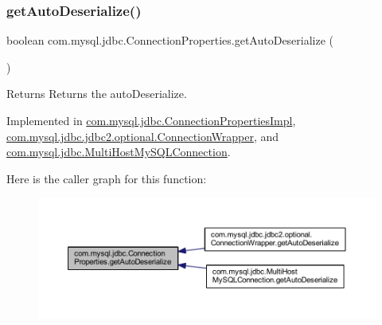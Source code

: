 \subsubsection{\texorpdfstring{get\+Auto\+Deserialize()}{getAutoDeserialize()}}
{\footnotesize\ttfamily boolean com.\+mysql.\+jdbc.\+Connection\+Properties.\+get\+Auto\+Deserialize (\begin{DoxyParamCaption}{ }\end{DoxyParamCaption})}

\begin{DoxyReturn}{Returns}
Returns the auto\+Deserialize. 
\end{DoxyReturn}


Implemented in \mbox{\hyperlink{classcom_1_1mysql_1_1jdbc_1_1_connection_properties_impl_a9ae6fe9a4c45a57da76d048b6fe39c34}{com.\+mysql.\+jdbc.\+Connection\+Properties\+Impl}}, \mbox{\hyperlink{classcom_1_1mysql_1_1jdbc_1_1jdbc2_1_1optional_1_1_connection_wrapper_af2ea2c3cad85f247aee8c022f1b50808}{com.\+mysql.\+jdbc.\+jdbc2.\+optional.\+Connection\+Wrapper}}, and \mbox{\hyperlink{classcom_1_1mysql_1_1jdbc_1_1_multi_host_my_s_q_l_connection_aad67a9027c49b02592706d86bf9497db}{com.\+mysql.\+jdbc.\+Multi\+Host\+My\+S\+Q\+L\+Connection}}.

Here is the caller graph for this function\+:\nopagebreak
\begin{figure}[H]
\begin{center}
\leavevmode
\includegraphics[width=350pt]{interfacecom_1_1mysql_1_1jdbc_1_1_connection_properties_aee9fe485d01db5f2c0094702cd16468e_icgraph}
\end{center}
\end{figure}
\mbox{\label{interfacecom_1_1mysql_1_1jdbc_1_1_connection_properties_a722ef2a90bea1ca220340a055850527f}} 
